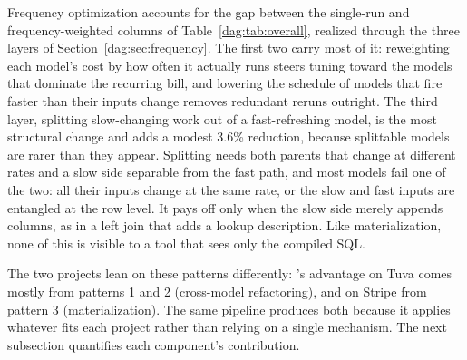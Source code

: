 

Frequency optimization accounts for the gap between the single-run and frequency-weighted columns of Table~\ref{dag:tab:overall}, realized through the three layers of Section~\ref{dag:sec:frequency}. The first two carry most of it: reweighting each model's cost by how often it actually runs steers tuning toward the models that dominate the recurring bill, and lowering the schedule of models that fire faster than their inputs change removes redundant reruns outright. The third layer, splitting slow-changing work out of a fast-refreshing model, is the most structural change and adds a modest 3.6\% reduction, because splittable models are rarer than they appear. Splitting needs both parents that change at different rates and a slow side separable from the fast path, and most models fail one of the two: all their inputs change at the same rate, or the slow and fast inputs are entangled at the row level. It pays off only when the slow side merely appends columns, as in a left join that adds a lookup description. Like materialization, none of this is visible to a tool that sees only the compiled SQL. 


The two projects lean on these patterns differently: \dagsmith{}'s advantage on Tuva comes mostly from patterns 1 and 2 (cross-model refactoring), and on Stripe from pattern 3 (materialization). The same pipeline produces both because it applies whatever fits each project rather than relying on a single mechanism. The next subsection quantifies each component's contribution.






